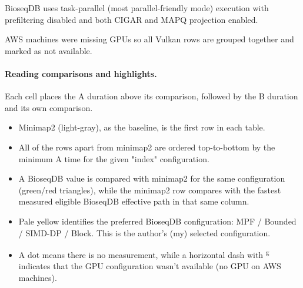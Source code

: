 BioseqDB uses task-parallel (most parallel-friendly mode) execution with prefiltering disabled and both CIGAR
and MAPQ projection enabled. 

AWS machines were missing GPUs so all Vulkan rows are grouped together and marked as not available.

\paragraph{Reading comparisons and highlights.}
Each cell places the A duration above its comparison, followed by the B duration
and its own comparison.
\begin{itemize}
  \item Minimap2 (light-gray), as the baseline, is the first row in each table.
  \item All of the rows apart from minimap2 are ordered top-to-bottom by the minimum A time for the given "index" configuration.
  \item A BioseqDB value is compared with minimap2 for the same configuration (green/red triangles), while the minimap2 row compares with the fastest
  measured eligible BioseqDB effective path in that same column.
  \item Pale yellow
  identifies the preferred BioseqDB configuration: MPF / Bounded / SIMD-DP /
  Block. This is the author's (my) selected configuration.
  \item A dot means there is no measurement, while a horizontal dash with \textsuperscript{g} indicates that the GPU configuration wasn't available (no GPU on AWS machines).
\end{itemize}



